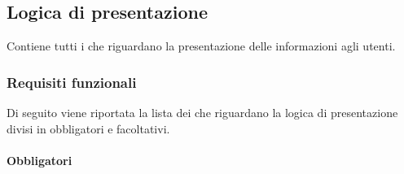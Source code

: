 \subsection{Logica di presentazione}
Contiene tutti i  che riguardano la presentazione delle informazioni agli utenti.

\subsubsection{Requisiti funzionali}
Di seguito viene riportata la lista dei  che riguardano la logica di presentazione divisi in  obbligatori e  facoltativi.

\paragraph{Obbligatori}

